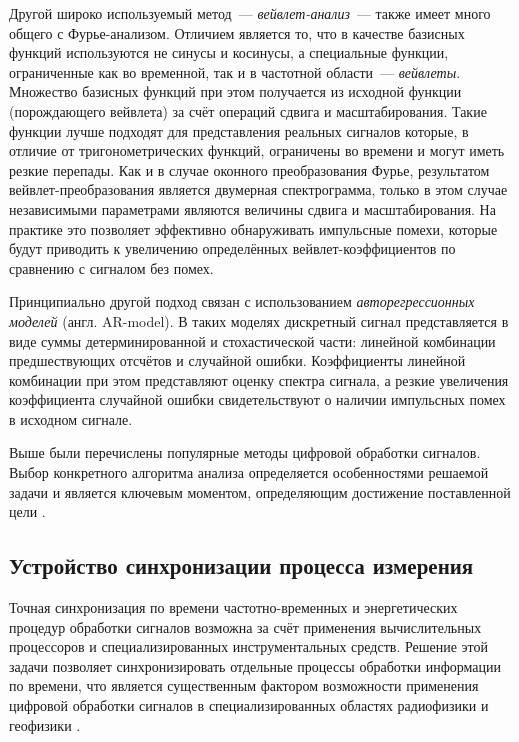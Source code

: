 \documentclass[a4paper, 14pt, titlepage]{extarticle}
\newcommand{\eng}[1]{\foreignlanguage{english}{#1}}
\newcommand{\term}[1]{\emph{#1}}
\begin{document}
  Другой широко используемый метод~--- \term{вейвлет-анализ}~--- также имеет много общего с
  Фурье-анализом. Отличием является то, что в качестве базисных функций используются не синусы и
  косинусы, а специальные функции, ограниченные как во временной, так и в частотной области~---
  \term{вейвлеты}. Множество базисных функций при этом получается из исходной функции (порождающего
  вейвлета) за счёт операций сдвига и масштабирования. Такие функции лучше подходят для представления
  реальных сигналов которые, в отличие от тригонометрических функций, ограничены во времени и могут иметь
  резкие перепады. Как и в случае оконного преобразования Фурье, результатом вейвлет-преобразования является
  двумерная спектрограмма, только в этом случае независимыми параметрами являются величины сдвига и
  масштабирования. На практике это позволяет эффективно обнаруживать импульсные помехи, которые
  будут приводить к увеличению определённых вейвлет-коэффициентов по сравнению с сигналом без помех.

  Принципиально другой подход связан с использованием \term{авторегрессионных моделей} (англ.
  \eng{AR-model}). В таких моделях дискретный сигнал представляется в виде суммы детерминированной и
  стохастической части: линейной комбинации предшествующих отсчётов и случайной ошибки.
  Коэффициенты линейной комбинации при этом представляют оценку спектра сигнала, а резкие увеличения
  коэффициента случайной ошибки свидетельствуют о наличии импульсных помех в исходном сигнале.

  Выше были перечислены популярные методы цифровой обработки сигналов. Выбор конкретного алгоритма
  анализа определяется особенностями решаемой задачи и является ключевым моментом, определяющим
  достижение поставленной цели \cite{zubarev-realtime}.

  \subsection{Устройство синхронизации процесса измерения}\label{ssec:sync}

  Точная синхронизация по времени частотно-временных и энергетических процедур обработки
  сигналов возможна за счёт применения вычислительных процессоров и специализированных
  инструментальных средств. Решение этой задачи позволяет синхронизировать отдельные процессы
  обработки информации по времени, что является существенным фактором возможности применения
  цифровой обработки сигналов в специализированных областях радиофизики и геофизики \cite{rathore-digital}.
\end{document}
